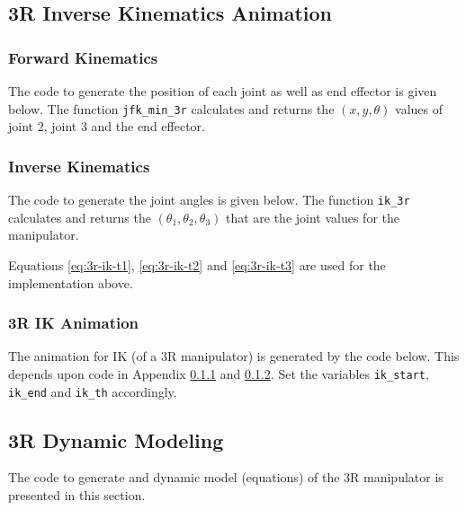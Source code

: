 
\subsection{3R Inverse Kinematics Animation}

\subsubsection{Forward Kinematics}
\label{app:3r-fk-code}

The code to generate the position of each joint as well as end effector is given below. The function \texttt{jfk\_min\_3r} calculates and returns the $(x, y, \theta)$ values of joint 2, joint 3 and the end effector.



\subsubsection{Inverse Kinematics}
\label{app:3r-ik-code}

The code to generate the joint angles is given below. The function \texttt{ik\_3r} calculates and returns the $(\theta_1, \theta_2, \theta_3)$ that are the joint values for the manipulator.



Equations \ref{eq:3r-ik-t1}, \ref{eq:3r-ik-t2} and \ref{eq:3r-ik-t3} are used for the implementation above.

\subsubsection{3R IK Animation}
\label{app:3r-ik-anim}

The animation for IK (of a 3R manipulator) is generated by the code below. This depends upon code in Appendix \ref{app:3r-fk-code} and \ref{app:3r-ik-code}. Set the variables \texttt{ik\_start}, \texttt{ik\_end} and \texttt{ik\_th} accordingly.



\subsection{3R Dynamic Modeling}
\label{app:3r-dyn-model-pycode}

The code to generate and dynamic model (equations) of the 3R manipulator is presented in this section.

